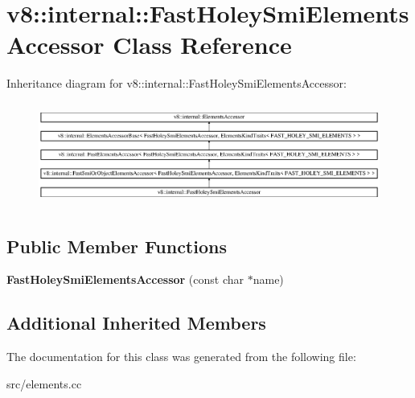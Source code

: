 \hypertarget{classv8_1_1internal_1_1_fast_holey_smi_elements_accessor}{}\section{v8\+:\+:internal\+:\+:Fast\+Holey\+Smi\+Elements\+Accessor Class Reference}
\label{classv8_1_1internal_1_1_fast_holey_smi_elements_accessor}
Inheritance diagram for v8\+:\+:internal\+:\+:Fast\+Holey\+Smi\+Elements\+Accessor\+:\begin{figure}[H]
\begin{center}
\leavevmode
\includegraphics[height=3.431373cm]{classv8_1_1internal_1_1_fast_holey_smi_elements_accessor}
\end{center}
\end{figure}
\subsection*{Public Member Functions}
\begin{DoxyCompactItemize}
\item 
\hypertarget{classv8_1_1internal_1_1_fast_holey_smi_elements_accessor_ad5b949112499564927dc43e14795df08}{}{\bfseries Fast\+Holey\+Smi\+Elements\+Accessor} (const char $\ast$name)\label{classv8_1_1internal_1_1_fast_holey_smi_elements_accessor_ad5b949112499564927dc43e14795df08}

\end{DoxyCompactItemize}
\subsection*{Additional Inherited Members}


The documentation for this class was generated from the following file\+:\begin{DoxyCompactItemize}
\item 
src/elements.\+cc\end{DoxyCompactItemize}
